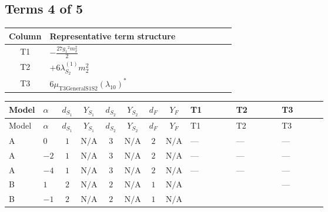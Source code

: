 \documentclass[8pt]{article}
\begin{document}
\begin{landscape}
\subsection*{Terms 4 of 5}
\begin{center}
\begin{tabular}{@{}c >{\raggedright\arraybackslash}p{0.82\linewidth}@{}}
\toprule
Column & Representative term structure \\
\midrule
T1 & \(\displaystyle -\frac{27 {g_1}^2 {m_2^2}}{2}\) \\
\midrule
T2 & \(\displaystyle +6 {\lambda_{S_2}^{(1)}} {m_2^2}\) \\
\midrule
T3 & \(\displaystyle 6 {\mu_{\mathrm{T3GeneralS1S2}}} \left({\lambda_{10}}\right)^{*}\) \\
\midrule
\bottomrule
\end{tabular}
\end{center}
\smallskip
\tiny
\begin{longtable}{@{}llcccccc >{\raggedright\arraybackslash}p{0.21\linewidth} >{\raggedright\arraybackslash}p{0.21\linewidth} >{\raggedright\arraybackslash}p{0.21\linewidth}@{}}
\toprule
Model & $\alpha$ & $d_{S_1}$ & $Y_{S_1}$ & $d_{S_2}$ & $Y_{S_2}$ & $d_F$ & $Y_F$ & T1 & T2 & T3 \\
\midrule
\endfirsthead
\toprule
Model & $\alpha$ & $d_{S_1}$ & $Y_{S_1}$ & $d_{S_2}$ & $Y_{S_2}$ & $d_F$ & $Y_F$ & T1 & T2 & T3 \\
\midrule
\endhead
A & $0$ & $1$ & $\text{N/A}$ & $3$ & $\text{N/A}$ & $2$ & $\text{N/A}$ & --- & --- & --- \\
\midrule
A & $-2$ & $1$ & $\text{N/A}$ & $3$ & $\text{N/A}$ & $2$ & $\text{N/A}$ & --- & --- & --- \\
\midrule
A & $-4$ & $1$ & $\text{N/A}$ & $3$ & $\text{N/A}$ & $2$ & $\text{N/A}$ & --- & --- & --- \\
\midrule
B & $1$ & $2$ & $\text{N/A}$ & $2$ & $\text{N/A}$ & $1$ & $\text{N/A}$ & \scriptsize\adjustbox{max width=\linewidth}{$\begin{gathered} -\frac{27 {g_1}^2 {m_2^2}}{2}\end{gathered}$} & \scriptsize\adjustbox{max width=\linewidth}{$\begin{gathered} +6 {\lambda_{S_2}^{(1)}} {m_2^2}\end{gathered}$} & --- \\
\midrule
B & $-1$ & $2$ & $\text{N/A}$ & $2$ & $\text{N/A}$ & $1$ & $\text{N/A}$ & \scriptsize\adjustbox{max width=\linewidth}{$\begin{gathered} -\frac{3 {g_1}^2 {m_2^2}}{2}\end{gathered}$} & \scriptsize\adjustbox{max width=\linewidth}{$\begin{gathered} +6 {\lambda_{S_2}^{(1)}} {m_2^2}\end{gathered}$} & \scriptsize\adjustbox{max width=\linewidth}{$\begin{gathered} 6 {\mu_{\mathrm{T3GeneralS1S2}}} \left({\lambda_{10}}\right)^{*}\end{gathered}$} \\

\end{longtable}
\end{landscape}
\end{document}
